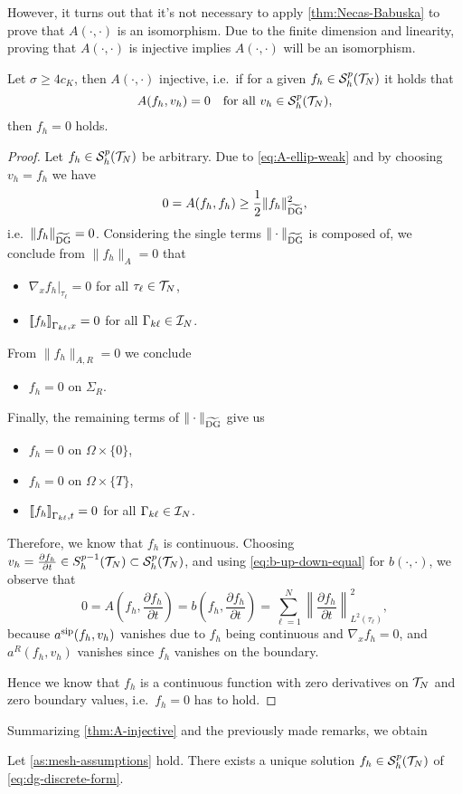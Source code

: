 \documentclass[../thesis.tex]{subfiles}
\begin{document}
However, it turns out that it's not necessary to apply \cref{thm:Necas-Babuska} to prove that $A(\cdot, \cdot)$ is an isomorphism. Due to the finite dimension and linearity, proving that $A(\cdot, \cdot)$ is injective implies $A(\cdot, \cdot)$ will be an isomorphism.
\begin{theorem}
\label{thm:A-injective}
Let $\sigma \geq 4 c_K$, then $A(\cdot, \cdot)$ injective, i.e.\ if for a given $f_h \in \mathcal{S}_h^p(\mathcal{T}_N)$ it holds that
\[
	A(f_h, v_h) = 0 \quad \text{for all } v_h \in \mathcal{S}_h^p(\mathcal{T}_N),
\]
then $f_h = 0$ holds.
\end{theorem}
\begin{proof}
Let $f_h \in \mathcal{S}_h^p(\mathcal{T}_N)$ be arbitrary.
Due to \cref{eq:A-ellip-weak} and by choosing $v_h = f_h$ we have
\[
	0 = A(f_h, f_h) \geq \frac{1}{2} \| f_h \|_{\widetilde{\mathrm{DG}}}^2,
\]
i.e.\ $\| f_h \|_{\widetilde{\mathrm{DG}}} = 0$. Considering the single terms $\| \cdot \|_{\widetilde{\mathrm{DG}}}$ is composed of, we conclude from $\| f_h \|_A = 0$ that
\begin{itemize}
	\item $\nabla_x f_h |_{\tau_\ell} = 0$ for all $\tau_\ell \in \mathcal{T}_N$,
	\item ${\lbrack\!\lbrack} f_h {\rbrack\!\rbrack}_{\Gamma_{k\ell}, x} = 0$ for all $\Gamma_{k\ell} \in \mathcal{I}_N$.
\end{itemize}
From $\| f_h \|_{A, R} = 0$ we conclude
\begin{itemize}
	\item $f_h = 0$ on $\Sigma_R$.
\end{itemize}
Finally, the remaining terms of $\| \cdot \|_{\widetilde{\mathrm{DG}}}$ give us
\begin{itemize}
	\item $f_h = 0$ on $\Omega \times \{ 0 \}$,
	\item $f_h = 0$ on $\Omega \times \{ T \}$,
	\item ${\lbrack\!\lbrack} f_h {\rbrack\!\rbrack}_{\Gamma_{k\ell}, t} = 0$ for all $\Gamma_{k\ell} \in \mathcal{I}_N$.
\end{itemize}
Therefore, we know that $f_h$ is continuous. Choosing $v_h = \frac{\partial f_h}{\partial t} \in S_h^{p-1}(\mathcal{T}_N) \subset \mathcal{S}_h^p(\mathcal{T}_N)$, and using \cref{eq:b-up-down-equal} for $b(\cdot, \cdot)$, we observe that
\[
	0 = A \left(f_h, \frac{\partial f_h}{\partial t}\right) = b\left(f_h,  \frac{\partial f_h}{\partial t}\right) = \sum_{\ell=1}^N \left\| \frac{\partial f_h}{\partial t} \right\|_{L^2(\tau_\ell)}^2,
\]
because $a^{\mathrm{sip}}(f_h, v_h)$ vanishes due to $f_h$ being continuous and $\nabla_x f_h = 0$, and $a^R(f_h, v_h)$ vanishes since $f_h$ vanishes on the boundary.

Hence we know that $f_h$ is a continuous function with zero derivatives on $\mathcal{T}_N$ and zero boundary values, i.e.\ $f_h = 0$ has to hold.  
\end{proof}
Summarizing \cref{thm:A-injective} and the previously made remarks, we obtain
\begin{theorem}
Let \cref{as:mesh-assumptions} hold. There exists a unique solution $f_h \in \mathcal{S}_h^p(\mathcal{T}_N)$ of \cref{eq:dg-discrete-form}.
\end{theorem}
\end{document}
